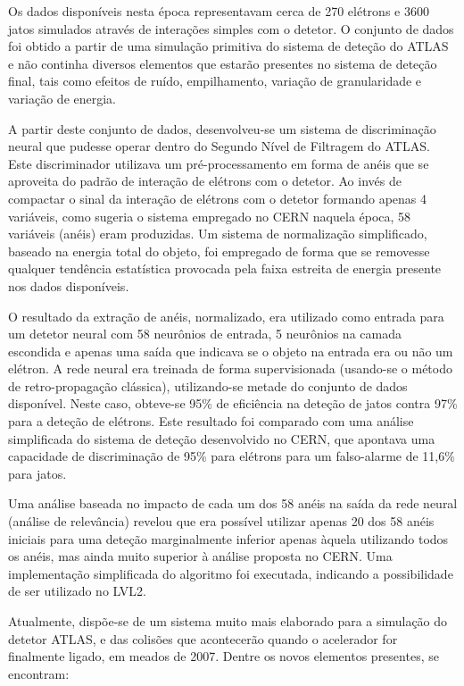 Os dados disponíveis nesta época representavam cerca de 270 elétrons e 3600
jatos simulados através de interações simples com o detetor. O conjunto de
dados foi obtido a partir de uma simulação primitiva do sistema de deteção do
ATLAS e não continha diversos elementos que estarão presentes no sistema
de deteção final, tais como efeitos de ruído, empilhamento, variação de
granularidade e variação de energia.

A partir deste conjunto de dados, desenvolveu-se um sistema de discriminação
neural que pudesse operar dentro do Segundo Nível de Filtragem do ATLAS. Este
discriminador utilizava um pré-processamento em forma de anéis que se
aproveita do padrão de interação de elétrons com o detetor. Ao invés de
compactar o sinal da interação de elétrons com o detetor formando apenas 4
variáveis, como sugeria o sistema empregado no CERN naquela época, 58 variáveis
(anéis) eram produzidas. Um sistema de normalização simplificado, baseado na
energia total do objeto, foi empregado de forma que se removesse qualquer
tendência estatística provocada pela faixa estreita de energia presente nos
dados disponíveis.

O resultado da extração de anéis, normalizado, era utilizado como entrada para
um detetor neural com 58 neurônios de entrada, 5 neurônios na camada escondida
e apenas uma saída que indicava se o objeto na entrada era ou não um
elétron. A rede neural era treinada de forma supervisionada (usando-se o
método de retro-propagação clássica), utilizando-se metade do conjunto de
dados disponível. Neste caso, obteve-se 95\% de eficiência na deteção de jatos
contra 97\% para a deteção de elétrons. Este resultado foi comparado com uma
análise simplificada do sistema de deteção desenvolvido no CERN, que apontava
uma capacidade de discriminação de 95\% para elétrons para um falso-alarme de
11,6\% para jatos.

Uma análise baseada no impacto de cada um dos 58 anéis na saída da rede neural
(análise de relevância) revelou que era possível utilizar apenas 20 dos 58
anéis iniciais para uma deteção marginalmente inferior apenas àquela
utilizando todos os anéis, mas ainda muito superior à análise proposta no
CERN. Uma implementação simplificada do algoritmo foi executada, indicando a
possibilidade de ser utilizado no LVL2.

Atualmente, dispõe-se de um sistema muito mais elaborado para a simulação do
detetor ATLAS, e das colisões que acontecerão quando o acelerador for
finalmente ligado, em meados de 2007. Dentre os novos elementos presentes, se
encontram:

